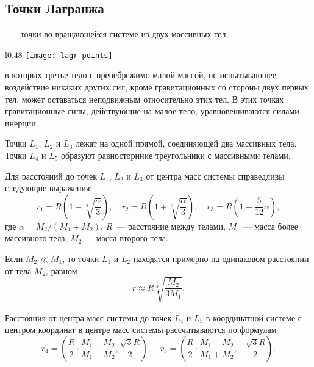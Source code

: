 \subsection{Точки Лагранжа}

~--- точки во вращающейся системе из двух массивных тел,
\begin{wrapfigure}[14]{l}{0.48\tw}
	\centering
	\vspace{-.5pc}
	\texttt{[image: lagr-points]}
	\label{pic:larg-points}	
\end{wrapfigure}
в которых третье тело с пренебрежимо 
малой массой, не испытывающее воздействие никаких 
других сил, кроме гравитационных со стороны двух 
первых тел, может оставаться неподвижным относительно 
этих тел. В этих точках гравитационные силы, 
действующие на малое тело, уравновешиваются силами инерции.

Точки $L_1$, $L_2$ и $L_3$ лежат на одной прямой, 
соединяющей два массивных тела. Точки $L_4$ и $L_5$ 
образуют равносторнние треугольники с массивными 
телами.

Для расстояний до точек $L_1$, $L_2$ и $L_3$ от 
центра масс системы справедливы следующие выражения:
\begin{equation}r_1=R\left(1-\sqrt[3]{\frac{\alpha}
{3}}\right), \quad r_2=R\left(1+\sqrt[3]{\frac{\alpha}
{3}}\right), \quad r_3=R\left(1+\frac{5}{12}\alpha\right),
\end{equation}
где $\alpha=M_2 / (M_1 + M_2)$, $R$~--- расстояние между 
телами, $M_1$ --- масса более массивного тела, $M_2$
 --- масса второго тела.

Если $M_2 \ll M_1$, то точки $L_1$ и $L_2$ находятся 
примерно на одинаковом расстоянии от тела $M_2$, равном
\begin{equation}
r\approx R\sqrt[3]{\frac{M_2}{3M_1}}.
\end{equation}

Расстояния от центра масс системы до точек $L_4$ и $L_5$ в координатной системе с центром координат в центре масс системы рассчитываются по  формулам
\begin{equation}
	 r_4 = \left ( \frac{R}{2} \cdot \frac{M_1-M_2}{M_1+M_2} ,   \frac{\sqrt{3}R}{2} \right ), \quad r_5 = \left ( \frac{R}{2} \cdot \frac{M_1-M_2}{M_1+M_2} ,   -\frac{\sqrt{3}R}{2} \right ). 
\end{equation}